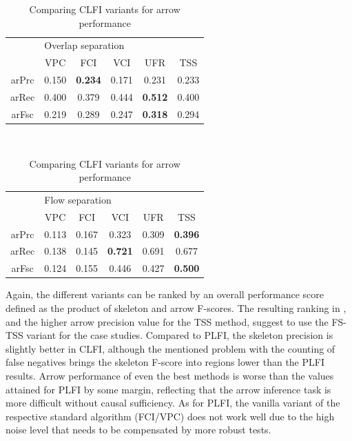 \begin{table}
 \centering
 \begin{tabular}{cccccc}
 \hline \hline
   & \multicolumn{5}{l}{Overlap separation}\\ 
        &   VPC &   FCI &   VCI &   UFR &   TSS\\ 
 \hline
  arPrc & 0.150 & \textbf{0.234} & 0.171 & 0.231 & 0.233\\
  arRec & 0.400 & 0.379 & 0.444 & \textbf{0.512} & 0.400\\
  arFsc & 0.219 & 0.289 & 0.247 & \textbf{0.318} & 0.294\\
  \hline
 \end{tabular}\\[0.5cm]
  \begin{tabular}{cccccc}
 \hline \hline
   & \multicolumn{5}{l}{Flow separation}\\ 
        &   VPC &   FCI &   VCI &   UFR &   TSS\\ 
 \hline
  arPrc & 0.113 & 0.167 & 0.323 & 0.309 & \textbf{0.396}\\
  arRec & 0.138 & 0.145 & \textbf{0.721} & 0.691 & 0.677\\
  arFsc & 0.124 & 0.155 & 0.446 & 0.427 & \textbf{0.500}\\
  \hline
 \end{tabular}
 \caption{Comparing CLFI variants for arrow performance}
 \label{contact-arrow-evaluation-nelex}
\end{table}

Again, the different variants can be ranked by an overall performance score defined as the product of skeleton and arrow F-scores. The resulting ranking in , and the higher arrow precision value for the TSS method, suggest to use the FS-TSS variant for the case studies. Compared to PLFI, the skeleton precision is slightly better in CLFI, although the mentioned problem with the counting of false negatives brings the skeleton F-score into regions lower than the PLFI results. Arrow performance of even the best methods is worse than the values attained for PLFI by some margin, reflecting that the arrow inference task is more difficult without causal sufficiency. As for PLFI, the vanilla variant of the respective standard algorithm (FCI/VPC) does not work well due to the high noise level that needs to be compensated by more robust tests.

